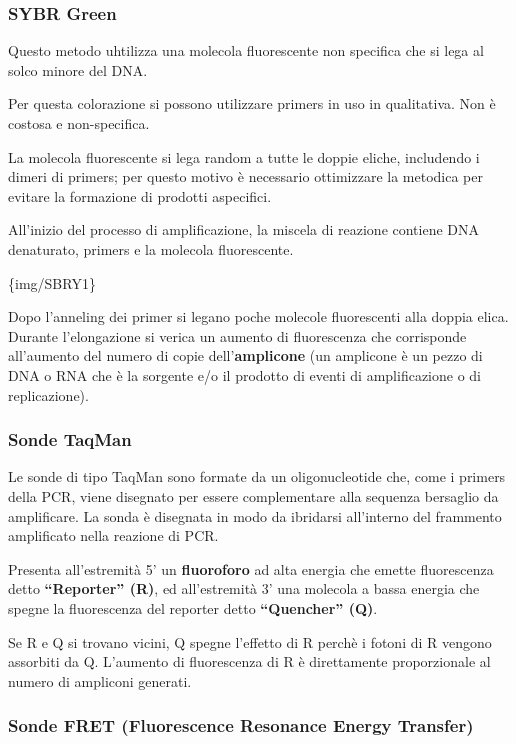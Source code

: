 \documentclass[11pt]{book}
\begin{document}
\subsubsection{SYBR Green}\label{sybr-green}

Questo metodo uhtilizza una molecola fluorescente non specifica che si
lega al solco minore del DNA.

Per questa colorazione si possono utilizzare primers in uso in
qualitativa. Non è costosa e non-specifica.

La molecola fluorescente si lega random a tutte le doppie eliche,
includendo i dimeri di primers; per questo motivo è necessario
ottimizzare la metodica per evitare la formazione di prodotti
aspecifici.

All'inizio del processo di amplificazione, la miscela di reazione
contiene DNA denaturato, primers e la molecola fluorescente.

\{img/SBRY1\}

Dopo l'anneling dei primer si legano poche molecole fluorescenti alla
doppia elica. Durante l'elongazione si verica un aumento di fluorescenza
che corrisponde all'aumento del numero di copie dell'\textbf{amplicone}
(un amplicone è un pezzo di DNA o RNA che è la sorgente e/o il prodotto
di eventi di amplificazione o di replicazione).

\subsubsection{Sonde TaqMan}\label{sonde-taqman}

Le sonde di tipo TaqMan sono formate da un oligonucleotide che, come i
primers della PCR, viene disegnato per essere complementare alla
sequenza bersaglio da amplificare. La sonda è disegnata in modo da
ibridarsi all'interno del frammento amplificato nella reazione di PCR.

Presenta all'estremità 5' un \textbf{fluoroforo} ad alta energia che
emette fluorescenza detto \textbf{``Reporter'' (R)}, ed all'estremità 3'
una molecola a bassa energia che spegne la fluorescenza del reporter
detto \textbf{``Quencher'' (Q)}.

Se R e Q si trovano vicini, Q spegne l'effetto di R perchè i fotoni di R
vengono assorbiti da Q. L'aumento di fluorescenza di R è direttamente
proporzionale al numero di ampliconi generati.

\subsubsection{Sonde FRET (Fluorescence Resonance Energy
Transfer)}\label{sonde-fret-fluorescence-resonance-energy-transfer}
\end{document}
